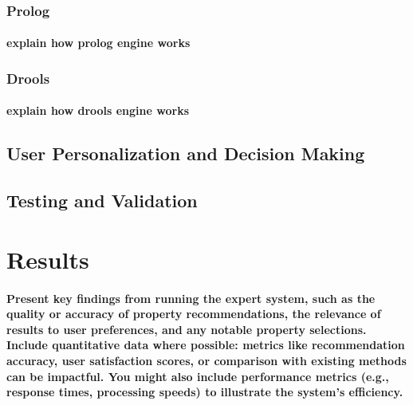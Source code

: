 \documentclass[runningheads]{llncs}
\begin{document}
\subsubsection{Prolog}
\paragraph{explain how prolog engine works}
\subsubsection{Drools}
\paragraph{explain how drools engine works}
\subsection{User Personalization and Decision Making}
\subsection{Testing and Validation}

\section{Results}

\paragraph{Present key findings from running the expert system, such as the quality or accuracy of property recommendations, the relevance of results to user preferences, and any notable property selections.
Include quantitative data where possible: metrics like recommendation accuracy, user satisfaction scores, or comparison with existing methods can be impactful. You might also include performance metrics (e.g., response times, processing speeds) to illustrate the system’s efficiency.}

%
%
%
% 
% 
%


\end{document}
